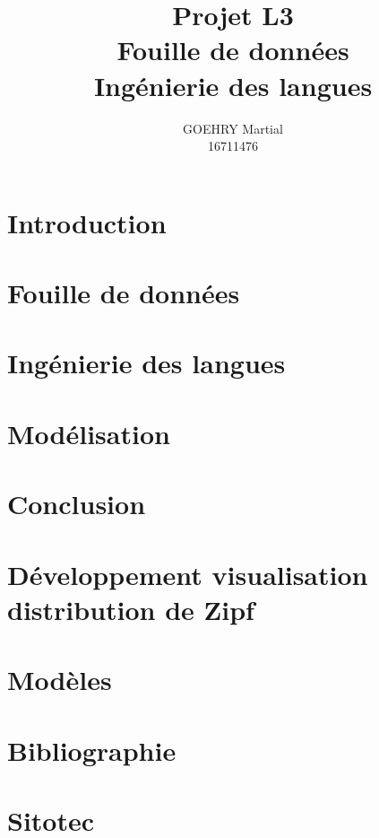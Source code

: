 \documentclass[a4paper,12pt]{article}
\title{Projet L3\\Fouille de données\\Ingénierie des langues}
\author{GOEHRY Martial\\16711476}
\begin{document}
	\maketitle
	\tableofcontents
	\newpage
	
	\section*{Introduction}
		
		\newpage

	\section{Fouille de données}
		\label{sec:fouille-de-donnees}
		
		\newpage
	
	\section{Ingénierie des langues}
		\label{sec:ingenierie-des-langues}
		
		\newpage

	\section{Modélisation}
		\label{sec:modelisation}
		
		\newpage

	\section*{Conclusion}
	
	\newpage
	\appendix
	\section{Développement visualisation distribution de Zipf}
		\label{sec:devZipf}
		
	\newpage

	\section{Modèles}
		\label{sec:modeles}
		
	\newpage

	\section{Bibliographie}
		\label{sec:bibliographie}
		
		
	\newpage


	\section{Sitotec}
\end{document}
